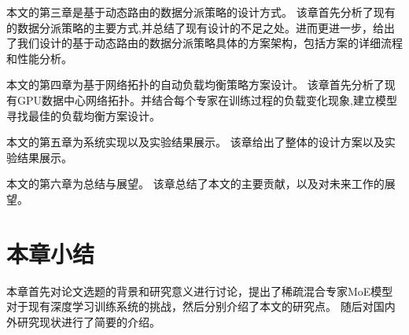 本文的第三章是基于动态路由的数据分派策略的设计方式。
%
该章首先分析了现有的数据分派策略的主要方式,并总结了现有设计的不足之处。进而更进一步，给出了我们设计的基于动态路由的数据分派策略具体的方案架构，包括方案的详细流程和性能分析。


本文的第四章为基于网络拓扑的自动负载均衡策略方案设计。
%
该章首先分析了现有GPU数据中心网络拓扑。并结合每个专家在训练过程的负载变化现象,建立模型寻找最佳的负载均衡方案设计。


本文的第五章为系统实现以及实验结果展示。
%
该章给出了整体的设计方案以及实验结果展示。

本文的第六章为总结与展望。
%
该章总结了本文的主要贡献，以及对未来工作的展望。


\section{本章小结}

本章首先对论文选题的背景和研究意义进行讨论，提出了稀疏混合专家MoE模型对于现有深度学习训练系统的挑战，然后分别介绍了本文的研究点。
%
随后对国内外研究现状进行了简要的介绍。

\endinput